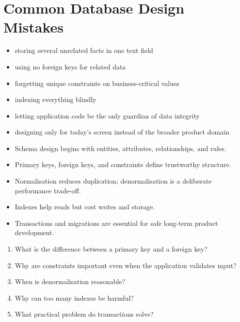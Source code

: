 \documentclass[12pt, a4paper, oneside]{book}
\begin{document}
\section{Common Database Design Mistakes}
\begin{itemize}[leftmargin=2em]
    \item storing several unrelated facts in one text field
    \item using no foreign keys for related data
    \item forgetting unique constraints on business-critical values
    \item indexing everything blindly
    \item letting application code be the only guardian of data integrity
    \item designing only for today's screen instead of the broader product domain
\end{itemize}

\begin{summarybox}
\begin{itemize}[leftmargin=2em]
    \item Schema design begins with entities, attributes, relationships, and rules.
    \item Primary keys, foreign keys, and constraints define trustworthy structure.
    \item Normalisation reduces duplication; denormalisation is a deliberate performance trade-off.
    \item Indexes help reads but cost writes and storage.
    \item Transactions and migrations are essential for safe long-term product development.
\end{itemize}
\end{summarybox}

\begin{recallbox}
\begin{enumerate}[leftmargin=2em]
    \item What is the difference between a primary key and a foreign key?
    \item Why are constraints important even when the application validates input?
    \item When is denormalisation reasonable?
    \item Why can too many indexes be harmful?
    \item What practical problem do transactions solve?
\end{enumerate}
\end{recallbox}
\end{document}
